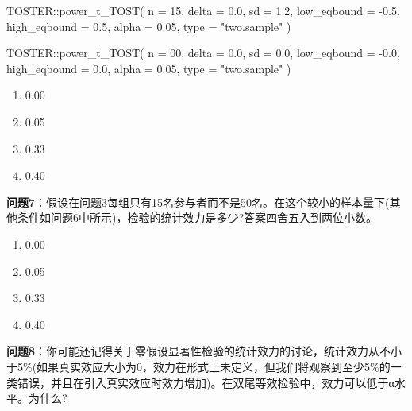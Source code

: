 \documentclass[
  letterpaper,
  DIV=11,
  numbers=noendperiod]{scrreprt}
\newenvironment{Shaded}{\begin{snugshade}}{\end{snugshade}}
\newcommand{\AttributeTok}[1]{\textcolor[rgb]{0.40,0.45,0.13}{#1}}
\newcommand{\DecValTok}[1]{\textcolor[rgb]{0.68,0.00,0.00}{#1}}
\newcommand{\FloatTok}[1]{\textcolor[rgb]{0.68,0.00,0.00}{#1}}
\newcommand{\FunctionTok}[1]{\textcolor[rgb]{0.28,0.35,0.67}{#1}}
\newcommand{\NormalTok}[1]{\textcolor[rgb]{0.00,0.23,0.31}{#1}}
\newcommand{\SpecialCharTok}[1]{\textcolor[rgb]{0.37,0.37,0.37}{#1}}
\newcommand{\StringTok}[1]{\textcolor[rgb]{0.13,0.47,0.30}{#1}}
\providecommand{\tightlist}{%
  \setlength{\itemsep}{0pt}\setlength{\parskip}{0pt}}\usepackage{longtable,booktabs,array}
\begin{document}
\begin{Shaded}
\begin{Highlighting}[]
\NormalTok{TOSTER}\SpecialCharTok{::}\FunctionTok{power\_t\_TOST}\NormalTok{(}
  \AttributeTok{n =} \DecValTok{15}\NormalTok{,}
  \AttributeTok{delta =} \FloatTok{0.0}\NormalTok{,}
  \AttributeTok{sd =} \FloatTok{1.2}\NormalTok{,}
  \AttributeTok{low\_eqbound =} \SpecialCharTok{{-}}\FloatTok{0.5}\NormalTok{,}
  \AttributeTok{high\_eqbound =} \FloatTok{0.5}\NormalTok{,}
  \AttributeTok{alpha =} \FloatTok{0.05}\NormalTok{,}
  \AttributeTok{type =} \StringTok{"two.sample"}
\NormalTok{)}
\end{Highlighting}
\end{Shaded}

\begin{Shaded}
\begin{Highlighting}[]
\NormalTok{TOSTER}\SpecialCharTok{::}\FunctionTok{power\_t\_TOST}\NormalTok{(}
  \AttributeTok{n =} \DecValTok{00}\NormalTok{,}
  \AttributeTok{delta =} \FloatTok{0.0}\NormalTok{,}
  \AttributeTok{sd =} \FloatTok{0.0}\NormalTok{,}
  \AttributeTok{low\_eqbound =} \SpecialCharTok{{-}}\FloatTok{0.0}\NormalTok{,}
  \AttributeTok{high\_eqbound =} \FloatTok{0.0}\NormalTok{,}
  \AttributeTok{alpha =} \FloatTok{0.05}\NormalTok{,}
  \AttributeTok{type =} \StringTok{"two.sample"}
\NormalTok{)}
\end{Highlighting}
\end{Shaded}

\begin{enumerate}
\def\labelenumi{\Alph{enumi})}
\tightlist
\item
  0.00
\item
  0.05
\item
  0.33
\item
  0.40
\end{enumerate}

\textbf{问题7}：假设在问题3每组只有15名参与者而不是50名。在这个较小的样本量下(其他条件如问题6中所示)，检验的统计效力是多少?答案四舍五入到两位小数。

\begin{enumerate}
\def\labelenumi{\Alph{enumi})}
\tightlist
\item
  0.00
\item
  0.05
\item
  0.33
\item
  0.40
\end{enumerate}

\textbf{问题8}：你可能还记得关于零假设显著性检验的统计效力的讨论，统计效力从不小于5\%(如果真实效应大小为0，效力在形式上未定义，但我们将观察到至少5\%的一类错误，并且在引入真实效应时效力增加)。在双尾等效检验中，效力可以低于α水平。为什么?
\end{document}
